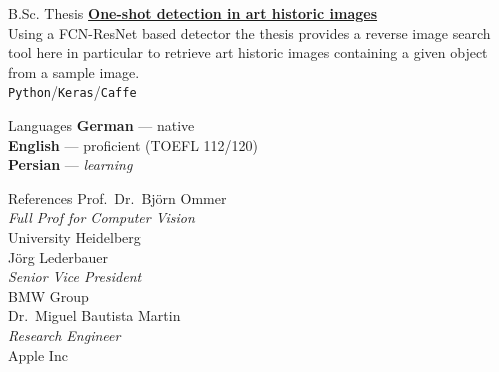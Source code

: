 \documentclass{article}
\newcommand{\cvsect}[1]{
	\vspace{\baselineskip}
	\colorbox{primary}{\textcolor{white}{\MakeUppercase{\textbf{#1}}}}\\
}
\newcommand{\slashsep}{\hspace{2mm}/\hspace{2mm}}
\begin{document}
\begin{cvbox}{B.Sc. Thesis}
    \textbf{\href{https://github.com/morris-frank/ba_latex/blob/master/thesis.pdf}{One-shot detection in art historic images}}\\
    Using a FCN-ResNet based detector the thesis provides a reverse image search tool here in particular to retrieve art historic images containing a given object from a sample image.\\
    \texttt{Python}\slashsep\texttt{Keras}\slashsep\texttt{Caffe}\\

\end{cvbox}
\hfill
\begin{cvbox}{Languages}
	\textbf{German} --- native\\
	\textbf{English} --- proficient (TOEFL 112/120)\\
    \textbf{Persian} --- \textit{learning}


\end{cvbox}
\hfill
\begin{cvbox}{References}
    Prof.\ Dr.\ Björn Ommer\\\emph{Full Prof for Computer Vision}\\University Heidelberg\\

    Jörg Lederbauer\\\emph{Senior Vice President}\\BMW Group\\

    Dr.\ Miguel Bautista Martin\\\emph{Research Engineer}\\Apple Inc
\end{cvbox}
\end{document}

